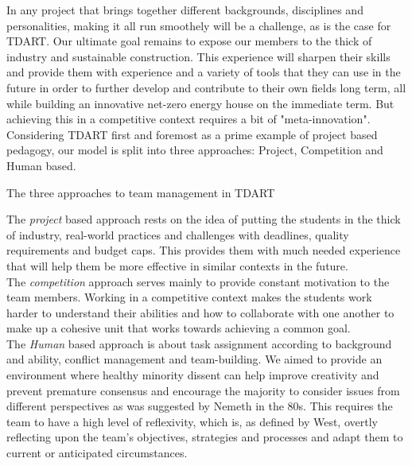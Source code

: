 \documentclass[justified]{tufte-book}
\begin{document}
	In any project that brings together different backgrounds, disciplines and personalities, making it all run smoothely will be a challenge, as is the case for TDART. Our ultimate goal remains to expose our members to the thick of industry and sustainable construction. This experience will sharpen their skills and provide them with experience and a variety of tools that they can use in the future in order to further develop and contribute to their own fields long term, all while building an innovative net-zero energy house on the immediate term. But achieving this in a competitive context requires a bit of "meta-innovation". Considering TDART first and foremost as a prime example of project based pedagogy, our model is split into three approaches: Project, Competition and Human based.
	\begin{marginfigure}
\caption{The three approaches to team management in TDART}
\end{marginfigure}
	The \textit{project} based approach rests on the idea of putting the students in the thick of industry, real-world practices and challenges with deadlines, quality requirements and budget caps. This provides them with much needed experience that will help them be more effective in similar contexts in the future.\\
	The \textit{competition} approach serves mainly to provide constant motivation to the team members. Working in a competitive context makes the students work harder to understand their abilities and how to collaborate with one another to make up a cohesive unit that works towards achieving a common goal.\\
	The \textit{Human} based approach is about task assignment according to background and ability, conflict management and team-building. We aimed to provide an environment where healthy minority dissent can help improve creativity and prevent premature consensus and encourage the majority to consider issues from different perspectives as was suggested by Nemeth\cite{nemeth1986differential} in the 80s. This requires the team to have a high level of reflexivity, which is, as defined by West\cite{west1996reflexivity}, overtly reflecting upon the team's objectives, strategies and processes and adapt them to current or anticipated circumstances.
	
	
	
	
\end{document}
